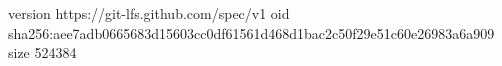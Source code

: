 version https://git-lfs.github.com/spec/v1
oid sha256:aee7adb0665683d15603cc0df61561d468d1bac2c50f29e51c60e26983a6a909
size 524384

